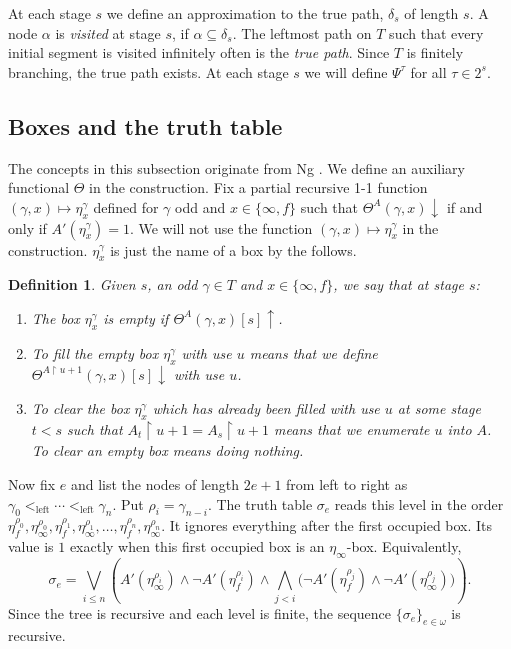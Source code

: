 \documentclass[11pt]{amsart}
\newtheorem{definition}[theorem]{Definition}
\begin{document}
At each stage $s$ we define an approximation to the true path, $\delta_s$ of length $s$. A node $\alpha$ is {\emph{visited}} at stage $s$, if
$\alpha \subseteq \delta_s$. The leftmost path on $T$ such that every initial segment
is visited infinitely often is the {\emph{true path}}. Since $T$ is finitely branching, the true path exists. At each stage $s$
we will define $\Psi^{\tau}$ for all $\tau \in 2^s$.

\subsection{Boxes and the truth table}\label{not} The concepts in this subsection originate from Ng {\cite{MR2387945}}. We define an auxiliary
functional $\Theta$ in the construction. Fix a partial recursive 1-1 function $(\gamma,x)\mapsto \eta_x^{\gamma}$ defined for $\gamma$ odd and $x \in \{\infty,f\}$ such that $\Theta^A (\gamma,x) \downarrow$ if and only if $A' (\eta_x^{\gamma}) = 1$.
We will not use the function $(\gamma,x)\mapsto \eta_x^{\gamma}$ in the construction. $\eta_x^{\gamma}$ is just the name of a box by the follows.

\begin{definition}
  Given $s$, an odd $\gamma \in T$ and $x \in \{ \infty, f \}$, we say that at stage $s$:
\begin{enumerate}[label=(\roman*)]
    \item The box $\eta_x^{\gamma}$ is {\emph{empty}} if $\Theta^{A} (\gamma,x)[s] \uparrow$.
    \item To {\emph{fill}} the empty box $\eta^{\gamma}_x$ with use $u$ means
  that we define $\Theta^{A \upharpoonright u + 1} (\gamma,x)[s] \downarrow$ with use
  $u$.
  \item To {\emph{clear}} the box $\eta^{\gamma}_x$ which has already been
  filled with use $u$ at some stage $t<s$ such that $A_t \upharpoonright u + 1 
  = A_s \upharpoonright u + 1$ means that we enumerate $u$ into $A$. To clear an empty box means doing nothing.
\end{enumerate}
\end{definition}



Now fix $e$ and list the nodes of length $2e+1$ from left to right as $\gamma_0<_{\mathrm{left}}\cdots
   <_{\mathrm{left}}\gamma_n$.
Put $\rho_i=\gamma_{n-i}$.  The truth table $\sigma_e$ reads this level in the order $\eta_f^{\rho_0},\eta_\infty^{\rho_0},
  \eta_f^{\rho_1},\eta_\infty^{\rho_1},\ldots,
  \eta_f^{\rho_n},\eta_\infty^{\rho_n}$.
It ignores everything after the first occupied box.  Its value is $1$ exactly
when this first occupied box is an $\eta_\infty$-box.  Equivalently,
\[
\sigma_e=
\bigvee_{i\le n}
  \left(
    A'(\eta_\infty^{\rho_i})\wedge
    \neg A'(\eta_f^{\rho_i})\wedge
    \bigwedge_{j<i}
      \bigl(\neg A'(\eta_f^{\rho_j})\wedge
             \neg A'(\eta_\infty^{\rho_j})\bigr)
  \right).
\]
Since the tree is recursive and each level is finite, the sequence
$\{\sigma_e\}_{e\in\omega}$ is recursive.
\end{document}
